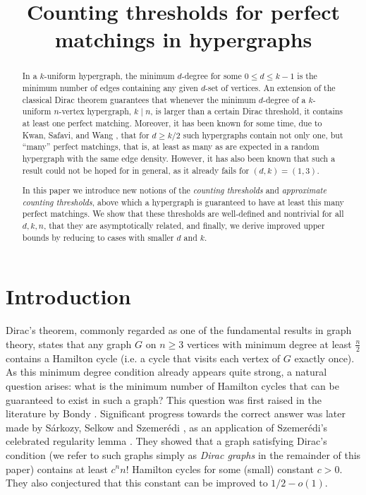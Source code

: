 \documentclass[11pt]{article}
\title{Counting thresholds for perfect matchings in hypergraphs}
\affil[1]{ETH Z\"urich\\Switzerland}
\date{}
\begin{document}
\maketitle

\begin{abstract}
    In a $k$-uniform hypergraph, the minimum $d$-degree for some $0\le d\le k-1$ is the minimum number of edges containing any given $d$-set of vertices. An extension of the classical Dirac theorem guarantees that whenever the minimum $d$-degree of a $k$-uniform $n$-vertex hypergraph, $k\mid n$, is larger than a certain Dirac threshold, it contains at least one perfect matching. Moreover, it has been known for some time, due to Kwan, Safavi, and Wang \cite{kwan2026counting}, that for $d\ge k/2$ such hypergraphs contain not only one, but ``many'' perfect matchings, that is, at least as many as are expected in a random hypergraph with the same edge density. However, it has also been known that such a result could not be hoped for in general, as it already fails for $(d,k)=(1,3)$.

    In this paper we introduce new notions of the \emph{counting thresholds} and \emph{approximate counting thresholds}, above which a hypergraph is guaranteed to have at least this many perfect matchings. We show that these thresholds are well-defined and nontrivial for all $d,k,n$, that they are asymptotically related, and finally, we derive improved upper bounds by reducing to cases with smaller $d$ and $k$.
\end{abstract}


\section{Introduction}\label{sec-intro}

Dirac's theorem, commonly regarded as one of the fundamental results in graph theory, states that any graph $G$ on $n\ge3$ vertices with minimum degree at least $\frac{n}{2}$ contains a Hamilton cycle (i.e. a cycle that visits each vertex of $G$ exactly once). As this minimum degree condition already appears quite strong, a natural question arises: what is the minimum number of Hamilton cycles that can be guaranteed to exist in such a graph? This question was first raised in the literature by Bondy \cite{bondy1996basic}. Significant progress towards the correct answer was later made by S\'arkozy, Selkow and Szemer\'edi \cite{sarkozy2003number}, as an application of Szemer\'edi's celebrated regularity lemma \cite{szemeredi1975regular}. They showed that a graph satisfying Dirac's condition (we refer to such graphs simply as \emph{Dirac graphs} in the remainder of this paper) contains at least $c^nn!$ Hamilton cycles for some (small) constant $c>0$. They also conjectured that this constant can be improved to $1/2-o(1)$.
\end{document}
